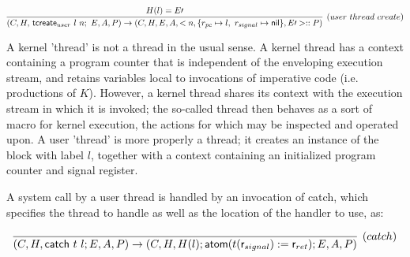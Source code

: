 \documentclass{article}
\newcommand{\catch}[0]{\textsf{catch}}
\newcommand{\ucreate}[0]{  \textsf{tcreate}$_{user}$}
\begin{document}
      \begin{displaymath}
\infer[(user\ thread \ create)]
   {(C, H, $\ucreate$ \ l \ n; \ E, A, P) \rightarrow (C, H, E, A, <n, \lbrace r_{pc} \mapsto l, \  r_{signal} \mapsto \textsf{nil}\rbrace, E\prime>::P)}
   {H(l) = E\prime}
   \end{displaymath} 

A kernel 'thread' is not a thread in the usual sense.  A kernel thread has a context containing a program counter that is independent of the enveloping execution stream, and retains variables local to invocations of imperative code (i.e. productions of $K$).  However, a kernel thread shares its context with the execution stream in which it is invoked; the so-called thread then behaves as a sort of macro for kernel execution, the actions for which may be inspected and operated upon.
A user 'thread' is more properly a thread; it creates an instance of the block with label $l$, together with a context containing an initialized program counter and signal register.

A system call by a user thread is handled by an invocation of \catch, which specifies the thread to handle as well as the location of the handler to use, as:

\begin{displaymath}
\infer[(catch)]
{(C, H, \catch \ t \ l; E, A, P) \rightarrow (C, H, H(l); \textsf{atom} (t (\textsf{r$_{signal}$}) := \textsf{r$_{ret}$}); E, A, P)}
{}
\\
\end{displaymath}
\end{document}

